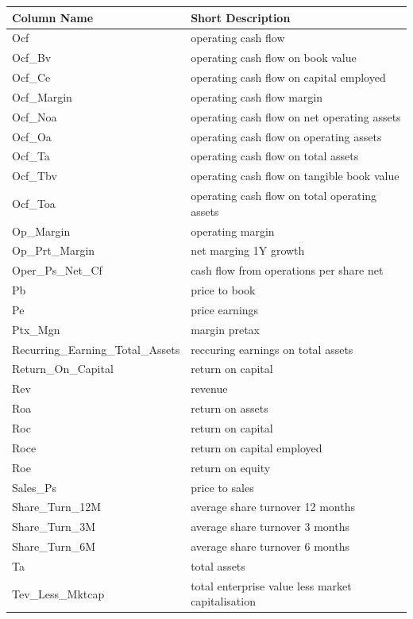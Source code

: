 \documentclass[]{krantz}
\theoremstyle{definition}
\theoremstyle{definition}
\theoremstyle{definition}
\theoremstyle{remark}
\begin{document}
\begin{table}
\begin{center}
\begin{tabular}{l l}
\textbf{Column Name}    &   \textbf{Short Description}  \\ \hline
Ocf &   operating cash flow \\
Ocf\_Bv &   operating cash flow on book value   \\
Ocf\_Ce &   operating cash flow on capital employed \\
Ocf\_Margin &   operating cash flow margin  \\
Ocf\_Noa    &   operating cash flow on net operating assets \\
Ocf\_Oa &   operating cash flow on operating assets \\
Ocf\_Ta &   operating cash flow on total assets \\
Ocf\_Tbv    &   operating cash flow on tangible book value  \\
Ocf\_Toa    &   operating cash flow on total operating assets   \\
Op\_Margin  &   operating margin    \\
Op\_Prt\_Margin &   net marging 1Y growth   \\
Oper\_Ps\_Net\_Cf   &   cash flow from operations per share net \\
Pb  &   price to book   \\
Pe  &   price earnings  \\
Ptx\_Mgn    &   margin pretax   \\
Recurring\_Earning\_Total\_Assets   &   reccuring earnings on total assets  \\
Return\_On\_Capital &   return on capital   \\
Rev &   revenue \\
Roa &   return on assets    \\
Roc &   return on capital   \\
Roce    &   return on capital employed  \\
Roe &   return on equity    \\
Sales\_Ps   &   price to sales  \\
Share\_Turn\_12M    &   average share turnover 12 months    \\
Share\_Turn\_3M &   average share turnover 3 months \\
Share\_Turn\_6M &   average share turnover 6 months \\
Ta  &   total assets    \\
Tev\_Less\_Mktcap   &   total enterprise value less market capitalisation   \\

\end{tabular}
\end{center}
\end{table}
\end{document}
